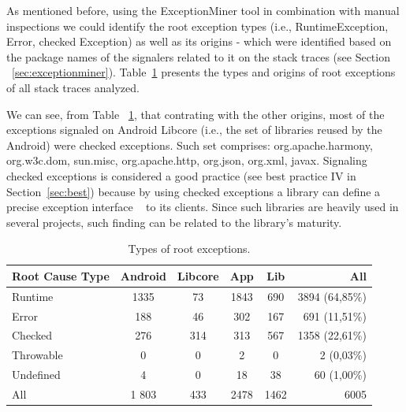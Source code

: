 \documentclass[conference]{IEEEtran}
\begin{document}
As mentioned before, using the ExceptionMiner tool in combination with manual inspections we could identify
the root exception types (i.e., RuntimeException, Error, checked Exception) as well as its origins - which were 
identified based on the package names of the signalers related to it on the stack traces (see Section ~\ref{sec:exceptionminer}).
Table~\ref{tab:typeroottab} presents the types and origins of root exceptions of all stack traces analyzed. 

We can see, from Table ~\ref{tab:typeroottab}, that contrating with the other origins, most of the 
 exceptions signaled on Android Libcore (i.e., the set of libraries reused by the Android) were 
checked exceptions. Such set comprises: org.apache.harmony, org.w3c.dom, sun.misc, 
org.apache.http, org.json, org.xml, javax. Signaling checked exceptions is considered a 
good practice (see best practice IV in Section~\ref{sec:best}) because by using checked exceptions a library can define a precise 
exception interface ~\cite{miller1997issues} to its clients.
 Since such libraries are heavily used  in several projects, such finding can be related to the library's maturity.


\begin{table}
\centering
\begin{tabular}{lccccr}
    \hline
    \bfseries{Root Cause Type} & \bfseries{Android} & \bfseries{Libcore} & \bfseries{App} & \bfseries{Lib}  & \bfseries{All}\\
    \hline

Runtime	&	1335	&	73	&	1843	&	690  &	3894 (64,85\%)\\  %
Error	       &	 188              &	 46	&	302             &	167	           &	691 (11,51\%)	\\
Checked	&	276           &	314	&	313          &	567	           &	1358 (22,61\%)	\\
Throwable	&	0	       &	0	&	2            &	0         &	2 (0,03\%)	\\
Undefined	&	4	&	0	&	18		&	38	   &	60	(1,00\%) \\
 \hline
All		& 1  803	&	433	&	2478	&	1462	&	6005	\\
    \hline
  \end{tabular}
\caption{Types of root exceptions.}
  \label{tab:typeroottab}
\end{table}
\end{document}
